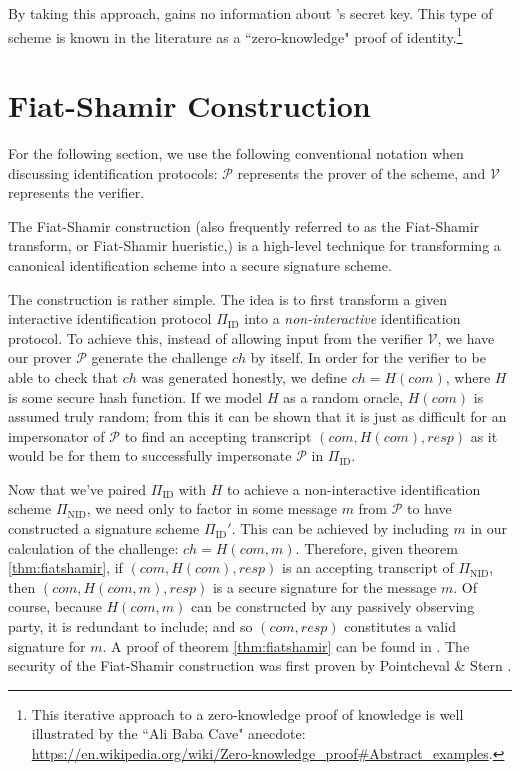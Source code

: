 By taking this approach, \alice gains no information about \bob's secret key. This type of scheme is known in the literature as a ``zero-knowledge" proof of identity.\footnote{This iterative approach to a zero-knowledge proof of knowledge is well illustrated by the ``Ali Baba Cave" anecdote: \url{https://en.wikipedia.org/wiki/Zero-knowledge_proof\#Abstract_examples}.}\\

\section{Fiat-Shamir Construction}

For the following section, we use the following conventional notation when discussing identification protocols: $\mathcal{P}$ represents the prover of the scheme, and $\mathcal{V}$ represents the verifier.

The Fiat-Shamir construction (also frequently referred to as the Fiat-Shamir transform, or Fiat-Shamir hueristic,) is a high-level technique for transforming a canonical identification scheme into a secure  signature scheme.

The construction is rather simple. The idea is to first transform a given interactive identification protocol $\Pi_{\text{ID}}$ into a \emph{non-interactive} identification protocol. To achieve this, instead of allowing input from the verifier $\mathcal{V}$, we have our prover $\mathcal{P}$ generate the challenge $ch$ by itself. In order for the verifier to be able to check that $ch$ was generated honestly, we define $ch = H(com)$, where $H$ is some secure hash function. If we model $H$ as a random oracle, $H(com)$ is assumed truly random; from this it can be shown that it is just as difficult for an impersonator of $\mathcal{P}$ to find an accepting transcript $(com, H(com), resp)$ as it would be for them to successfully impersonate $\mathcal{P}$ in $\Pi_{\text{ID}}$.

Now that we've paired $\Pi_{\text{ID}}$ with $H$ to achieve a non-interactive identification scheme $\Pi_{\text{NID}}$, we need only to factor in some message $m$ from $\mathcal{P}$ to have constructed a signature scheme $\Pi_{\text{ID}}'$. This can be achieved by including $m$ in our calculation of the challenge: $ch = H(com, m)$. Therefore, given theorem \ref{thm:fiatshamir}, if $(com, H(com), resp)$ is an accepting transcript of $\Pi_{\text{NID}}$, then $(com, H(com, m), resp)$ is a secure signature for the message $m$. Of course, because $H(com, m)$ can be constructed by any passively observing party, it is redundant to include; and so $(com,resp)$ constitutes a valid signature for $m$. A proof of theorem \ref{thm:fiatshamir} can be found in \cite{sigs}. The security of the Fiat-Shamir construction was first proven by Pointcheval \& Stern \cite{fsproof}.

